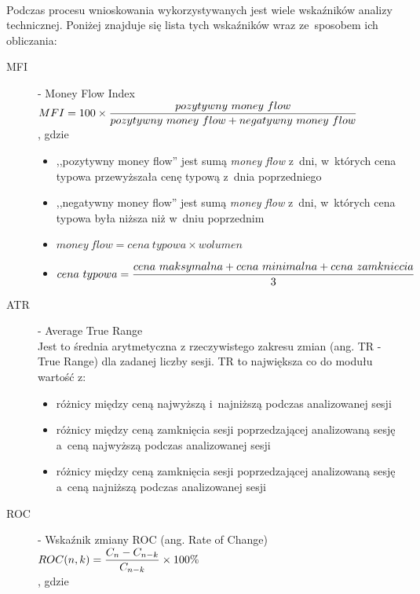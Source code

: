 \paragraph{}
Podczas procesu wnioskowania wykorzystywanych jest wiele wskaźników analizy technicznej. Poniżej znajduje się lista tych wskaźników wraz ze~sposobem ich obliczania:
\begin{description}
	\item[MFI] - Money Flow Index \hfill \\
		$\displaystyle MFI = 100 \times { pozytywny\ money\ flow \over pozytywny \ money \ flow + negatywny\ money\ flow }$  \hfill \\
			, gdzie \hfill
				\begin{itemize}
					\item ,,pozytywny money flow'' jest sumą {\textit{money flow}} z~dni, w~których cena typowa przewyższała cenę typową z~dnia poprzedniego
					\item ,,negatywny money flow'' jest sumą {\textit{money flow}} z~dni, w~których cena typowa była niższa niż w~dniu poprzednim
					\item $\displaystyle money \ flow = cena \ typowa \times wolumen$
					\item $\displaystyle cena\ typowa = {cena \ maksymalna + cena \ minimalna + cena \ zamkniecia \over 3}$
				\end{itemize}
	\item[ATR] - Average True Range \hfill \\
		Jest to średnia arytmetyczna z rzeczywistego zakresu zmian (ang. TR - True Range) dla zadanej liczby sesji. TR to największa co do modułu wartość z:
		\begin{itemize}
			\item różnicy między ceną najwyższą i~najniższą podczas analizowanej sesji
			\item różnicy między ceną zamknięcia sesji poprzedzającej analizowaną sesję a~ceną najwyższą podczas analizowanej sesji
			\item różnicy między ceną zamknięcia sesji poprzedzającej analizowaną sesję a~ceną najniższą podczas analizowanej sesji
		\end{itemize}
	\item[ROC] - Wskaźnik zmiany ROC (ang. Rate of Change) \hfill \\
		$\displaystyle ROC(n, k) = { C_n - C_{n-k} \over C_{n-k} } \times 100\%$ \\
		, gdzie \hfill
			\begin{itemize}

\end{itemize}
\end{description}
